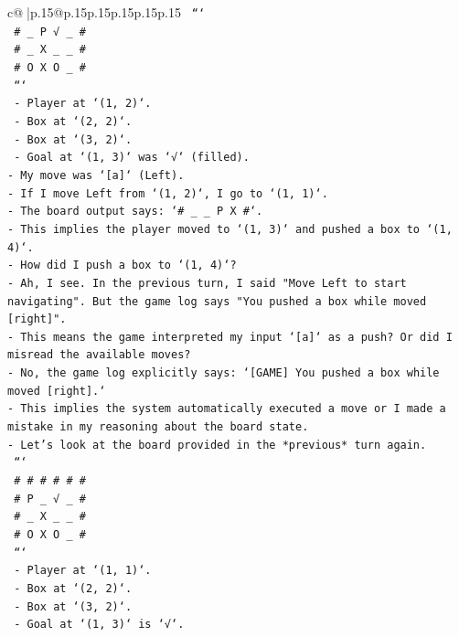 \documentclass{article}
\begin{document}
{\begin{supertabular}{c@{$\;$}|p{.15\linewidth}@{}p{.15\linewidth}p{.15\linewidth}p{.15\linewidth}p{.15\linewidth}p{.15\linewidth}}
{{{\texttt{  ```} \\
\texttt{  \# \_ P √ \_ \#} \\
\texttt{  \# \_ X \_ \_ \#} \\
\texttt{  \# O X O \_ \#} \\
\texttt{  ```} \\
\texttt{  {-} Player at `(1, 2)`.} \\
\texttt{  {-} Box at `(2, 2)`.} \\
\texttt{  {-} Box at `(3, 2)`.} \\
\texttt{  {-} Goal at `(1, 3)` was `√` (filled).} \\
\texttt{{-} My move was `{[}a{]}` (Left).} \\
\texttt{{-} If I move Left from `(1, 2)`, I go to `(1, 1)`.} \\
\texttt{{-} The board output says: `\# \_ \_ P X \#`.} \\
\texttt{{-} This implies the player moved to `(1, 3)` and pushed a box to `(1, 4)`.} \\
\texttt{{-} How did I push a box to `(1, 4)`?} \\
\texttt{{-} Ah, I see. In the previous turn, I said "Move Left to start navigating". But the game log says "You pushed a box while moved {[}right{]}".} \\
\texttt{{-} This means the game interpreted my input `{[}a{]}` as a push? Or did I misread the available moves?} \\
\texttt{{-} No, the game log explicitly says: `{[}GAME{]} You pushed a box while moved {[}right{]}.`} \\
\texttt{{-} This implies the system automatically executed a move or I made a mistake in my reasoning about the board state.} \\
\texttt{{-} Let's look at the board provided in the *previous* turn again.} \\
\texttt{  ```} \\
\texttt{  \# \# \# \# \# \#} \\
\texttt{  \# P \_ √ \_ \#} \\
\texttt{  \# \_ X \_ \_ \#} \\
\texttt{  \# O X O \_ \#} \\
\texttt{  ```} \\
\texttt{  {-} Player at `(1, 1)`.} \\
\texttt{  {-} Box at `(2, 2)`.} \\
\texttt{  {-} Box at `(3, 2)`.} \\
\texttt{  {-} Goal at `(1, 3)` is `√`.} \\
}}}
\end{supertabular}}
\end{document}
